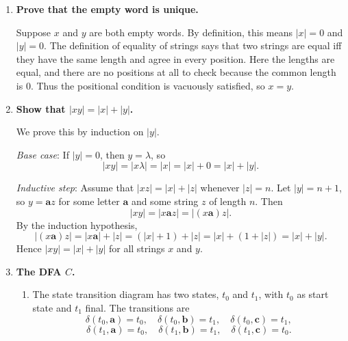 \documentclass[11pt,openany]{book}
\begin{document}
\begin{enumerate}[{1.}1.]
\begin{enumerate}
\item The quintuple is
\[
\langle\{\pmb{a},\pmb{b},\pmb{c}\},\{s,a,b,c,q_{acc},q_{rej}\},s,\delta,\{s,a,b,c,q_{acc}\}\rangle,
\]
where
\[
\delta(s,\pmb{a})=a,\qquad \delta(s,\pmb{b})=b,\qquad \delta(s,\pmb{c})=c,
\]
\[
\delta(a,\pmb{a})=q_{rej},\qquad \delta(a,\pmb{b})=q_{acc},\qquad \delta(a,\pmb{c})=q_{acc},
\]
\[
\delta(b,\pmb{a})=q_{acc},\qquad \delta(b,\pmb{b})=q_{rej},\qquad \delta(b,\pmb{c})=q_{acc},
\]
\[
\delta(c,\pmb{a})=q_{acc},\qquad \delta(c,\pmb{b})=q_{acc},\qquad \delta(c,\pmb{c})=q_{rej},
\]
and
\[
\delta(q_{acc},x)=q_{acc},\qquad \delta(q_{rej},x)=q_{rej}
\]
for every $x\in\{\pmb{a},\pmb{b},\pmb{c}\}$.
\end{enumerate}

\item \textbf{Prove that the empty word is unique.}

Suppose $x$ and $y$ are both empty words. By definition, this means $|x|=0$ and $|y|=0$. The definition of equality of strings says that two strings are equal iff they have the same length and agree in every position. Here the lengths are equal, and there are no positions at all to check because the common length is $0$. Thus the positional condition is vacuously satisfied, so $x=y$.

\item \textbf{Show that $|xy| = |x| + |y|$.}

We prove this by induction on $|y|$.

\textit{Base case}: If $|y|=0$, then $y=\lambda$, so
\[
|xy|=|x\lambda|=|x|=|x|+0=|x|+|y|.
\]

\textit{Inductive step}: Assume that $|xz|=|x|+|z|$ whenever $|z|=n$. Let $|y|=n+1$, so $y=\pmb{a}z$ for some letter $\pmb{a}$ and some string $z$ of length $n$. Then
\[
|xy|=|x\pmb{a}z|=|(x\pmb{a})z|.
\]
By the induction hypothesis,
\[
|(x\pmb{a})z|=|x\pmb{a}|+|z|=(|x|+1)+|z|=|x|+(1+|z|)=|x|+|y|.
\]
Hence $|xy|=|x|+|y|$ for all strings $x$ and $y$.

\item \textbf{The DFA $C$.}

\begin{enumerate}
\item The state transition diagram has two states, $t_0$ and $t_1$, with $t_0$ as start state and $t_1$ final. The transitions are
\[
\delta(t_0,\pmb{a})=t_0,\quad \delta(t_0,\pmb{b})=t_1,\quad \delta(t_0,\pmb{c})=t_1,
\]
\[
\delta(t_1,\pmb{a})=t_0,\quad \delta(t_1,\pmb{b})=t_1,\quad \delta(t_1,\pmb{c})=t_0.
\]


\end{enumerate}
\end{enumerate}
\end{document}

